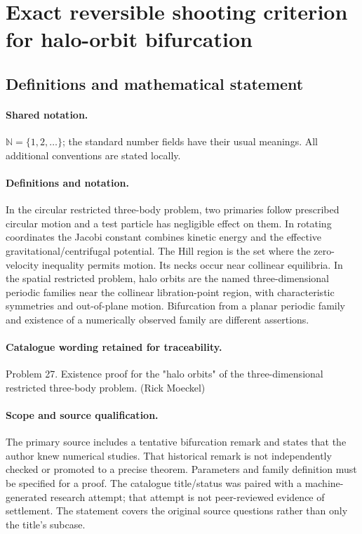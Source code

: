\documentclass[11pt]{article}
\begin{document}
\section{Exact reversible shooting criterion for halo-orbit bifurcation}\label{statement}

\subsection{Definitions and mathematical statement}

\paragraph{Shared notation.}$\mathbb N=\{1,2,\ldots\}$; the standard number fields have their usual meanings. All additional conventions are stated locally.


\paragraph{Definitions and notation.}In the circular restricted three-body problem, two primaries follow prescribed circular motion and a test particle has negligible effect on them. In rotating coordinates the Jacobi constant combines kinetic energy and the effective gravitational/centrifugal potential. The Hill region is the set where the zero-velocity inequality permits motion. Its necks occur near collinear equilibria. In the spatial restricted problem, halo orbits are the named three-dimensional periodic families near the collinear libration-point region, with characteristic symmetries and out-of-plane motion. Bifurcation from a planar periodic family and existence of a numerically observed family are different assertions.

\paragraph{Catalogue wording retained for traceability.}
Problem 27. Existence proof for the "halo orbits" of the three-dimensional restricted three-body problem. (Rick Moeckel)
\paragraph{Scope and source qualification.}The primary source includes a tentative bifurcation remark and states that the author knew numerical studies. That historical remark is not independently checked or promoted to a precise theorem. Parameters and family definition must be specified for a proof. The catalogue title/status was paired with a machine-generated research attempt; that attempt is not peer-reviewed evidence of settlement. The statement covers the original source questions rather than only the title’s subcase.
\end{document}
